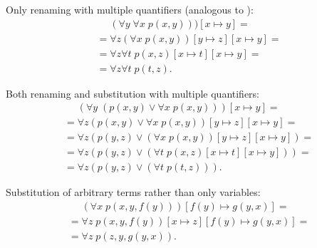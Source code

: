 \begin{example}
\begin{ExEnum}
     Only renaming with multiple quantifiers (analogous to ):
    \begin{align*}
      &{}\phantom{=}{}
      (\forall y\; \forall x\; p(x, y)))[x \mapsto y]
      = \\ &=
      \forall z (\forall x\; p(x, y))[y \mapsto z][x \mapsto y]
      = \\ &=
      \forall z \forall t\; p(x, z)[x \mapsto t][x \mapsto y]
      = \\ &=
      \forall z \forall t\; p(t, z).
    \end{align*}

     Both renaming and substitution with multiple quantifiers:
    \begin{align*}
      &{}\phantom{=}{}
      (\forall y\; (p(x, y) \vee \forall x\; p(x, y)))[x \mapsto y]
      = \\ &=
      \forall z (p(x, y) \vee \forall x\; p(x, y))[y \mapsto z][x \mapsto y]
      = \\ &=
      \forall z (p(y, z) \vee (\forall x\; p(x, y))[y \mapsto z][x \mapsto y])
      = \\ &=
      \forall z (p(y, z) \vee (\forall t\; p(x, z)[x \mapsto t][x \mapsto y]))
      = \\ &=
      \forall z (p(y, z) \vee (\forall t\; p(t, z))).
    \end{align*}

     Substitution of arbitrary terms rather than only variables:
    \begin{align*}
      &{}\phantom{=}{}
      (\forall x\; p(x, y, f(y)))[f(y) \mapsto g(y, x)]
      = \\ &=
      \forall z\; p(x, y, f(y))[x \mapsto z][f(y) \mapsto g(y, x)]
      = \\ &=
      \forall z\; p(z, y, g(y, x)).
    \end{align*}
  \end{ExEnum}
\end{example}
